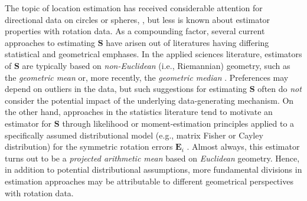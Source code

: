 The topic of location estimation has received considerable attention for directional data on circles or spheres, \citep[see][]{fisher53, karcher77, khatri77, fisher85, ducharme87, bajaj88, liu92, chan93, mardia00}, but less is known about  estimator properties with rotation data.
As a compounding factor, several current approaches to estimating $\bm S$ have arisen out of literatures having differing statistical and geometrical emphases.  In the  applied sciences literature, estimators of $\bm S$ are typically based on
{\it non-Euclidean} (i.e., Riemannian) geometry, such as the \emph{geometric mean} \citep{arun87, horn88, umeyama91, moakher02} or, more recently, the \emph{geometric median} \citep{fletcher08, fletcher09}.
Preferences may depend on outliers in the data, but such suggestions for estimating $\bm S$
often do {\it not} consider the potential impact of the
underlying data-generating mechanism.   On the other hand,
approaches in the statistics literature tend to motivate an estimator for $\bm S$  through likelihood or moment-estimation principles applied to a specifically assumed distributional model (e.g., matrix Fisher or Cayley distribution) for the symmetric rotation errors $\bm E_i$ \citep{downs72, jupp79, leon06, bingham10}. Almost always, this estimator turns out to be 
a \emph{projected arithmetic mean} based on {\it Euclidean} geometry. Hence, in addition to potential distributional assumptions, more fundamental divisions in estimation approaches may be attributable to different geometrical perspectives with rotation data.  

